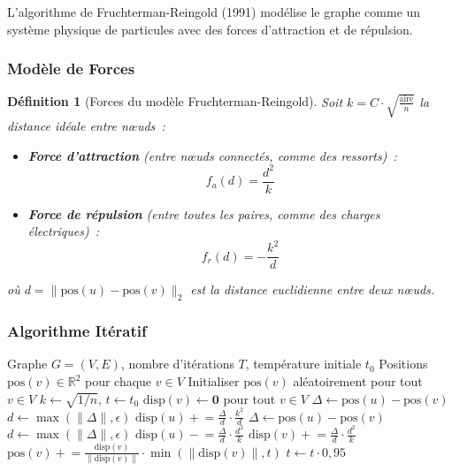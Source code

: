 \documentclass[12pt,a4paper]{article}
\newtheorem{definition}{Définition}[section]
\begin{document}
L'algorithme de Fruchterman-Reingold (1991) modélise le graphe comme un système physique de particules avec des forces d'attraction et de répulsion.

\subsubsection{Modèle de Forces}

\begin{definition}[Forces du modèle Fruchterman-Reingold]
Soit $k = C \cdot \sqrt{\frac{\text{aire}}{n}}$ la distance idéale entre n\oe{}uds~:
\begin{itemize}
    \item \textbf{Force d'attraction} (entre n\oe{}uds connectés, comme des ressorts)~:
    \[
        f_a(d) = \frac{d^2}{k}
    \]
    \item \textbf{Force de répulsion} (entre toutes les paires, comme des charges électriques)~:
    \[
        f_r(d) = -\frac{k^2}{d}
    \]
\end{itemize}
où $d = \|\text{pos}(u) - \text{pos}(v)\|_2$ est la distance euclidienne entre deux n\oe{}uds.
\end{definition}

\subsubsection{Algorithme Itératif}

\begin{algorithm}[H]
\caption{Algorithme de Fruchterman-Reingold}
\begin{algorithmic}[1]
\Require Graphe $G = (V, E)$, nombre d'itérations $T$, temp\'{e}rature initiale $t_0$
\Ensure Positions $\text{pos}(v) \in \mathbb{R}^2$ pour chaque $v \in V$
\State Initialiser $\text{pos}(v)$ al\'{e}atoirement pour tout $v \in V$
\State $k \leftarrow \sqrt{1/n}$, $t \leftarrow t_0$
    \State $\text{disp}(v) \leftarrow \mathbf{0}$ pour tout $v \in V$
     
        \State $\Delta \leftarrow \text{pos}(u) - \text{pos}(v)$
        \State $d \leftarrow \max(\|\Delta\|, \epsilon)$
        \State $\text{disp}(u) \mathrel{+}= \frac{\Delta}{d} \cdot \frac{k^2}{d}$
    \EndFor
     
        \State $\Delta \leftarrow \text{pos}(u) - \text{pos}(v)$
        \State $d \leftarrow \max(\|\Delta\|, \epsilon)$
        \State $\text{disp}(u) \mathrel{-}= \frac{\Delta}{d} \cdot \frac{d^2}{k}$
        \State $\text{disp}(v) \mathrel{+}= \frac{\Delta}{d} \cdot \frac{d^2}{k}$
    \EndFor
        \State $\text{pos}(v) \mathrel{+}= \frac{\text{disp}(v)}{\|\text{disp}(v)\|} \cdot \min(\|\text{disp}(v)\|, t)$
    \EndFor
    \State $t \leftarrow t \cdot 0{,}95$ 
\EndFor
\end{algorithmic}
\end{algorithm}
\end{document}
